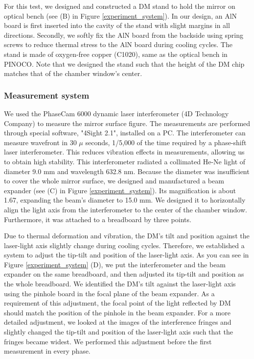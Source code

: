 \documentclass[a4paper]{article}
\begin{document}
For this test, we designed and constructed a DM stand to hold the mirror on optical bench (see (B) in Figure \ref{experiment_system}). In our design, an AlN board is first inserted into the cavity of the stand with slight margins in all directions. Secondly, we softly fix the AlN board from the backside using spring screws to reduce thermal stress to the AlN board during cooling cycles. The stand is made of oxygen-free copper (C1020), same as the optical bench in PINOCO. Note that we designed the stand such that the height of the DM chip matches that of the chamber window's center.

\subsubsection{Measurement system}
We used the PhaseCam 6000 dynamic laser interferometer (4D Technology Company) to measure the mirror surface figure. The measurements are performed through special software, "4Sight 2.1", installed on a PC. The interferometer can measure wavefront in 30 $\mu$ seconds, 1/5,000 of the time required by a phase-shift laser interferometer. This reduces vibration effects in measurements, allowing us to obtain high stability. This interferometer radiated a collimated He-Ne light of diameter 9.0 mm and wavelength 632.8 nm. Because the diameter was insufficient to cover the whole mirror surface, we designed and manufactured a beam expander (see (C) in Figure \ref{experiment_system}). Its magnification is about 1.67, expanding the beam's diameter to 15.0 mm. We designed it to horizontally align the light axis from the interferometer to the center of the chamber window. Furthermore, it was attached to a breadboard by three points.

Due to thermal deformation and vibration, the DM's tilt and position against the laser-light axis slightly change during cooling cycles. Therefore, we established a system to adjust the tip-tilt and position of the laser-light axis. As you can see in Figure \ref{experiment_system} (D), we put the interferometer and the beam expander on the same breadboard, and then adjusted its tip-tilt and position as the whole breadboard. We identified the DM's tilt against the laser-light axis using the pinhole board in the focal plane of the beam expander. As a requirement of this adjustment, the focal point of the light reflected by DM should match the position of the pinhole in the beam expander. For a more detailed adjustment, we looked at the images of the interference fringes and slightly changed the tip-tilt and position of the laser-light axis such that the fringes became widest. We performed this adjustment before the first measurement in every phase. 
\end{document}
